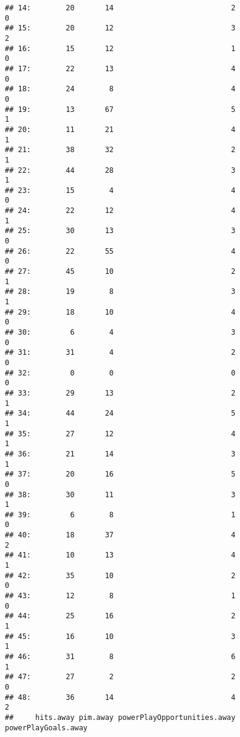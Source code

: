 \documentclass[
]{article}
\begin{document}
\begin{verbatim}
## 14:        20       14                           2                   0
## 15:        20       12                           3                   2
## 16:        15       12                           1                   0
## 17:        22       13                           4                   0
## 18:        24        8                           4                   0
## 19:        13       67                           5                   1
## 20:        11       21                           4                   1
## 21:        38       32                           2                   1
## 22:        44       28                           3                   1
## 23:        15        4                           4                   0
## 24:        22       12                           4                   1
## 25:        30       13                           3                   0
## 26:        22       55                           4                   0
## 27:        45       10                           2                   1
## 28:        19        8                           3                   1
## 29:        18       10                           4                   0
## 30:         6        4                           3                   0
## 31:        31        4                           2                   0
## 32:         0        0                           0                   0
## 33:        29       13                           2                   1
## 34:        44       24                           5                   1
## 35:        27       12                           4                   1
## 36:        21       14                           3                   1
## 37:        20       16                           5                   0
## 38:        30       11                           3                   1
## 39:         6        8                           1                   0
## 40:        18       37                           4                   2
## 41:        10       13                           4                   1
## 42:        35       10                           2                   0
## 43:        12        8                           1                   0
## 44:        25       16                           2                   1
## 45:        16       10                           3                   1
## 46:        31        8                           6                   1
## 47:        27        2                           2                   0
## 48:        36       14                           4                   2
##     hits.away pim.away powerPlayOpportunities.away powerPlayGoals.away

\end{verbatim}
\end{document}
